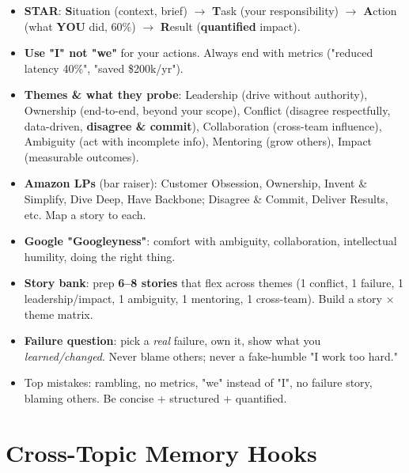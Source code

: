 \documentclass[11pt]{article}
\providecommand{\tightlist}{\setlength{\itemsep}{1pt}\setlength{\parskip}{0pt}}
\begin{document}
\begin{itemize}
\tightlist
\item
  \textbf{STAR}: \textbf{S}ituation (context, brief) \(\rightarrow\) \textbf{T}ask (your responsibility) \(\rightarrow\) \textbf{A}ction (what \textbf{YOU} did, 60\%) \(\rightarrow\) \textbf{R}esult (\textbf{quantified} impact).
\item
  \textbf{Use "I" not "we"} for your actions. Always end with metrics ("reduced latency 40\%", "saved \$200k/yr").
\item
  \textbf{Themes \& what they probe}: Leadership (drive without authority), Ownership (end-to-end, beyond your scope), Conflict (disagree respectfully, data-driven, \textbf{disagree \& commit}), Collaboration (cross-team influence), Ambiguity (act with incomplete info), Mentoring (grow others), Impact (measurable outcomes).
\item
  \textbf{Amazon LPs} (bar raiser): Customer Obsession, Ownership, Invent \& Simplify, Dive Deep, Have Backbone; Disagree \& Commit, Deliver Results, etc. Map a story to each.
\item
  \textbf{Google "Googleyness"}: comfort with ambiguity, collaboration, intellectual humility, doing the right thing.
\item
  \textbf{Story bank}: prep \textbf{6--8 stories} that flex across themes (1 conflict, 1 failure, 1 leadership/impact, 1 ambiguity, 1 mentoring, 1 cross-team). Build a story \(\times\) theme matrix.
\item
  \textbf{Failure question}: pick a \emph{real} failure, own it, show what you \emph{learned/changed}. Never blame others; never a fake-humble "I work too hard."
\item
  Top mistakes: rambling, no metrics, "we" instead of "I", no failure story, blaming others. Be concise + structured + quantified.
\end{itemize}

\section{Cross-Topic Memory Hooks}\label{cross-topic-memory-hooks}
\end{document}
